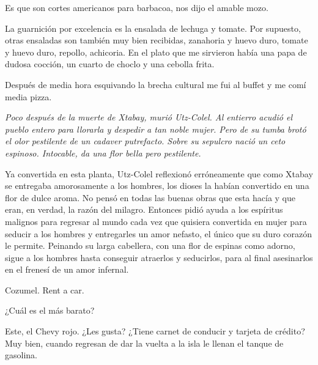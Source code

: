 \documentclass[12pt,twoside,openright,a5paper]{book}
\begin{document}
Es que son cortes americanos para barbacoa, nos dijo el amable mozo.

La guarnición por excelencia es la ensalada de lechuga y tomate. Por
supuesto, otras ensaladas son también muy bien recibidas, zanahoria y huevo
duro, tomate y huevo duro, repollo, achicoria. En el plato que me sirvieron
había una papa de dudosa cocción, un cuarto de choclo y una cebolla frita.

Después de media hora esquivando la brecha cultural me fui al buffet y me
comí media pizza.


\vspace{0.5cm}
\hrulefill\hspace{0.2cm} \decofourleft\decofourright \hspace{0.2cm} \hrulefill
\vspace{0.5cm}

{\em Poco después de la muerte de Xtabay, murió Utz-Colel. Al entierro
acudió el pueblo entero para llorarla y despedir a tan noble mujer. Pero de su
tumba brotó el olor pestilente de un cadaver putrefacto. Sobre su sepulcro
nació un ceto espinoso. Intocable, da una flor bella pero pestilente.

Ya convertida en esta planta, Utz-Colel reflexionó erróneamente que como
Xtabay se entregaba amorosamente a los hombres, los dioses la habían
convertido en una flor de dulce aroma. No pensó en todas las buenas obras
que esta hacía y que eran, en verdad, la razón del milagro. Entonces pidió
ayuda a los espíritus malignos para  regresar al mundo cada vez que quisiera
convertida en mujer para seducir a los hombres y entregarles un amor nefasto,
el único que su duro corazón le permite. Peinando su larga cabellera, con
una flor de espinas como adorno, sigue a los hombres hasta conseguir atraerlos
y seducirlos, para al final asesinarlos en el frenesí de un amor infernal.}


\vspace{0.5cm}
\hrulefill\hspace{0.2cm} \decofourleft\decofourright \hspace{0.2cm} \hrulefill
\vspace{0.5cm}

Cozumel. Rent a car.

¿Cuál es el más barato?

Este, el Chevy rojo. ¿Les gusta? ¿Tiene carnet de conducir y tarjeta de
crédito? Muy bien, cuando regresan de dar la vuelta a la isla le llenan
el tanque de gasolina.
\end{document}
